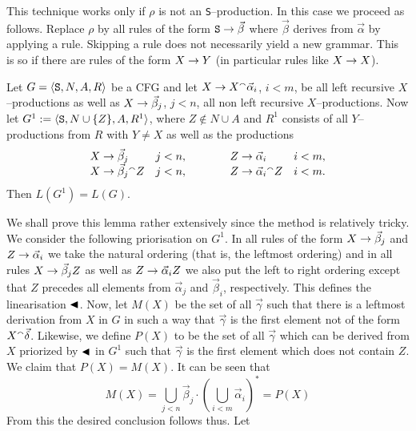 This technique works only if $\rho$ is not an
{\tt S}--production. In this case we proceed as follows.
Replace $\rho$ by all rules of the form $\mbox{\tt S} \pf %
\vec{\beta}$ where $\vec{\beta}$ derives from $\vec{\alpha}$
by applying a rule. Skipping a rule does not necessarily
yield a new grammar. This is so if there are rules of the form
$X \rightarrow Y$ (in particular rules like $X \rightarrow X$).
\begin{lem}
\label{lem:linksrek}
Let $G = \langle \mbox{\tt S}, N, A, R\rangle$ be a CFG 
and let $X \rightarrow X {^{\smallfrown}} \vec{\alpha}_i$, $i < m$, be all left recursive
$X$--productions as well as $X \rightarrow \vec{\beta}_j$, $j < n$, all
non left recursive $X$--productions.  Now let $G^1 := \langle \mbox{\tt S},
N \cup \{Z\}, A, R^1\rangle$, where $Z \not\in N %
\cup A$ and $R^1$ consists of all $Y$--productions from
$R$ with $Y \neq X$ as well as the productions
\begin{equation}
\begin{array}{l@{\quad}l@{\qquad\qquad}l@{\quad}l}
X \pf \vec{\beta}_j & j < n, &
    Z \pf \vec{\alpha}_i & i < m, \\
X \pf \vec{\beta}_j \conc Z & j < n, &
    Z \pf \vec{\alpha}_i \conc Z & i < m.
    \end{array}
\end{equation}
Then $L(G^1) = L(G)$.
\end{lem}
\proofbeg
We shall prove this lemma rather extensively since the method is
relatively tricky. We consider the following priorisation on
$G^1$. In all rules of the form $X \rightarrow \vec{\beta}_j$ and
$Z \rightarrow \vec{\alpha}_i$ we take the natural ordering (that is,
the leftmost ordering) and in all rules $X \rightarrow \vec{\beta}_jZ$
as well as $Z \rightarrow \vec{\alpha}_iZ$ we also put the left to right
ordering except that $Z$ precedes all elements from $\vec{\alpha}_j$
and $\vec{\beta}_i$, respectively. This defines the linearisation
$\blacktriangleleft$. Now, let $M(X)$ be the set of all
$\vec{\gamma}$ such that there is a leftmost derivation from
$X$ in $G$ in such a way that $\vec{\gamma}$ is the first element
not of the form $X {^{\smallfrown}} \vec{\delta}$.  Likewise, we define
$P(X)$ to be the set of all $\vec{\gamma}$ which can be derived
from $X$ priorized by $\blacktriangleleft$ in $G^1$ such that $\vec{\gamma}$ is
the first element which does not contain $Z$. We claim that
$P(X) = M(X)$. It can be seen that
\begin{equation}
M(X) = \bigcup_{j < n} \vec{\beta}_j \cdot (\bigcup_{i < m}
\vec{\alpha}_i)^{\ast} = P(X)
\end{equation}
From this the desired conclusion follows thus.  Let
